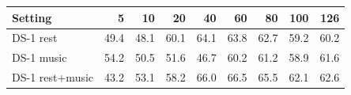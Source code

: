 \small
\begin{tabular}{lrrrrrrrr}
\hline
Setting & 5 & 10 & 20 & 40 & 60 & 80 & 100 & 126 \\
\hline
DS-1 rest & 49.4 & 48.1 & 60.1 & 64.1 & 63.8 & 62.7 & 59.2 & 60.2 \\
DS-1 music & 54.2 & 50.5 & 51.6 & 46.7 & 60.2 & 61.2 & 58.9 & 61.6 \\
DS-1 rest+music & 43.2 & 53.1 & 58.2 & 66.0 & 66.5 & 65.5 & 62.1 & 62.6 \\
\hline
\end{tabular}
